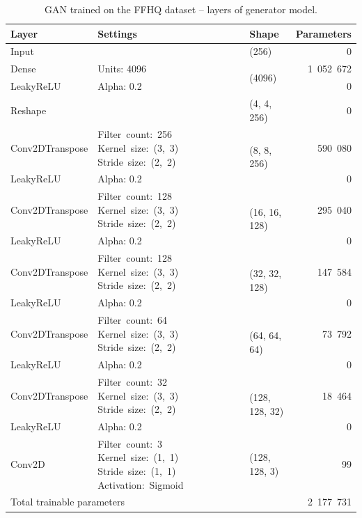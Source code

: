 \begin{table}
    \begin{center}
        \begin{tabular}{ |m{8em}|m{8.8em}|l|r| }
            \hline
                Layer & Settings & Shape & \multicolumn{1}{l|}{Parameters} \\
            \hline
            \hline
                Input & & (256) & 0 \\
            \hline
                Dense & Units: 4096 & \multirow{2}{6em}{(4096)} & 1~052~672 \\
            \cline{1-2} \cline{4-4}
                LeakyReLU & Alpha: 0.2 & & 0 \\
            \hline
                Reshape & & (4, 4, 256) & 0 \\
            \hline
                Conv2DTranspose & \mbox{Filter count: 256} \mbox{Kernel size: (3, 3)} \mbox{Stride size: (2, 2)} & \multirow{2}{6em}{(8, 8, 256)} & 590~080 \\
            \cline{1-2} \cline{4-4}
                LeakyReLU & Alpha: 0.2 & & 0 \\
            \hline
                Conv2DTranspose & \mbox{Filter count: 128} \mbox{Kernel size: (3, 3)} \mbox{Stride size: (2, 2)} & \multirow{2}{6em}{(16, 16, 128)} & 295~040 \\
            \cline{1-2} \cline{4-4}
                LeakyReLU & Alpha: 0.2 & & 0 \\
            \hline
                Conv2DTranspose & \mbox{Filter count: 128} \mbox{Kernel size: (3, 3)} \mbox{Stride size: (2, 2)} & \multirow{2}{6em}{(32, 32, 128)} & 147~584 \\
            \cline{1-2} \cline{4-4}
                LeakyReLU & Alpha: 0.2 & & 0 \\
            \hline
                Conv2DTranspose & \mbox{Filter count: 64} \mbox{Kernel size: (3, 3)} \mbox{Stride size: (2, 2)} & \multirow{2}{6em}{(64, 64, 64)} & 73~792 \\
            \cline{1-2} \cline{4-4}
                LeakyReLU & Alpha: 0.2 & & 0 \\
            \hline
                Conv2DTranspose & \mbox{Filter count: 32} \mbox{Kernel size: (3, 3)} \mbox{Stride size: (2, 2)} & \multirow{2}{6em}{(128, 128, 32)} & 18~464 \\
            \cline{1-2} \cline{4-4}
                LeakyReLU & Alpha: 0.2 & & 0 \\
            \hline
                Conv2D & \mbox{Filter count: 3} \mbox{Kernel size: (1, 1)} \mbox{Stride size: (1, 1)} \mbox{Activation: Sigmoid} & (128, 128, 3) & 99 \\
            \hline
            \hline
                \multicolumn{3}{|l|}{Total trainable parameters} & 2~177~731 \\
            \hline
        \end{tabular}
    \end{center}
    \caption{\label{tab:gan-ffhq-generator}GAN trained on the FFHQ dataset – layers of generator model.}
\end{table}

